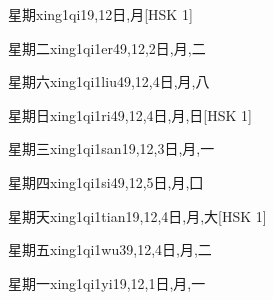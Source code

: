 \begin{EntryWithPhonetic}{星期}{xing1qi1}{9,12}{⽇,⽉}[HSK 1]
\end{EntryWithPhonetic}

\begin{EntryWithPhonetic}{星期二}{xing1qi1er4}{9,12,2}{⽇,⽉,⼆}
\end{EntryWithPhonetic}

\begin{EntryWithPhonetic}{星期六}{xing1qi1liu4}{9,12,4}{⽇,⽉,⼋}
\end{EntryWithPhonetic}

\begin{EntryWithPhonetic}{星期日}{xing1qi1ri4}{9,12,4}{⽇,⽉,⽇}[HSK 1]
\end{EntryWithPhonetic}

\begin{EntryWithPhonetic}{星期三}{xing1qi1san1}{9,12,3}{⽇,⽉,⼀}
\end{EntryWithPhonetic}

\begin{EntryWithPhonetic}{星期四}{xing1qi1si4}{9,12,5}{⽇,⽉,⼞}
\end{EntryWithPhonetic}

\begin{EntryWithPhonetic}{星期天}{xing1qi1tian1}{9,12,4}{⽇,⽉,⼤}[HSK 1]
\end{EntryWithPhonetic}

\begin{EntryWithPhonetic}{星期五}{xing1qi1wu3}{9,12,4}{⽇,⽉,⼆}
\end{EntryWithPhonetic}

\begin{EntryWithPhonetic}{星期一}{xing1qi1yi1}{9,12,1}{⽇,⽉,⼀}
\end{EntryWithPhonetic}

